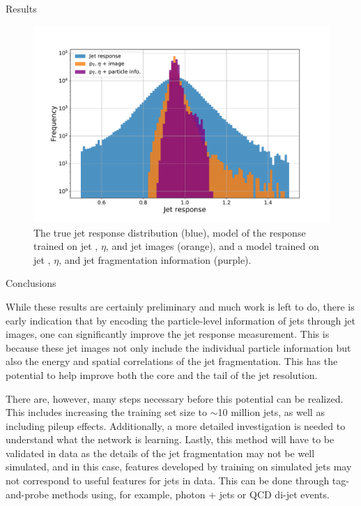 \begin{section}{Results}
\begin{figure}[tbp!]
\begin{center}
\includegraphics[angle=0,width=0.80\columnwidth]{fig/dnn_prediction.pdf}
\end{center}
\caption{The true jet response distribution (blue), model of the response trained on jet \pT, $\eta$, and jet images (orange), and a model trained on jet \pT, $\eta$, and jet fragmentation information (purple).}
\label{fig:dnn_prediction}
\end{figure}

\end{section}

\begin{section}{Conclusions}

While these results are certainly preliminary and much work is left to do, there is early indication that by encoding the particle-level information of jets through jet images, one can significantly improve the jet response measurement.
This is because these jet images not only include the individual particle information but also the energy and spatial correlations of the jet fragmentation.
This has the potential to help improve both the core and the tail of the jet resolution.

There are, however, many steps necessary before this potential can be realized.
This includes increasing the training set size to $\sim$10 million jets, as well as including pileup effects.
Additionally, a more detailed investigation is needed to understand what the network is learning.
Lastly, this method will have to be validated in data as the details of the jet fragmentation may not be well simulated, and in this case, features developed by training on simulated jets may not correspond to useful features for jets in data.
This can be done through tag-and-probe methods using, for example, photon + jets or QCD di-jet events.

\end{section}
